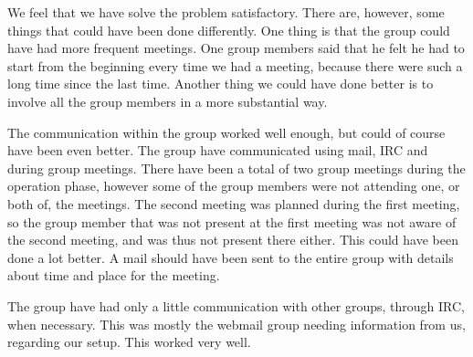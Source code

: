 
We feel that we have solve the problem satisfactory. There are, however, some things that could have been done differently. One thing is that the group could have had more frequent meetings. One group members said that he felt he had to start from the beginning every time we had a meeting, because there were such a long time since the last time. Another thing we could have done better is to involve all the group members in a more substantial way. 

The communication within the group worked well enough, but could of course have been even better. The group have communicated using mail, IRC and during group meetings. There have been a total of two group meetings during the operation phase, however some of the group members were not attending one, or both of, the meetings. The second meeting was planned during the first meeting, so the group member that was not present at the first meeting was not aware of the second meeting, and was thus not present there either. This could have been done a lot better. A mail should have been sent to the entire group with details about time and place for the meeting.

The group have had only a little communication with other groups, through IRC, when necessary. This was mostly the webmail group needing information from us, regarding our setup. This worked very well.